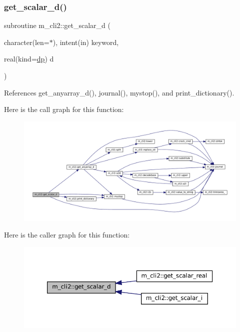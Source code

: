 \subsubsection{\texorpdfstring{get\+\_\+scalar\+\_\+d()}{get\_scalar\_d()}}
{\footnotesize\ttfamily subroutine m\+\_\+cli2\+::get\+\_\+scalar\+\_\+d (\begin{DoxyParamCaption}\item[{character(len=$\ast$), intent(in)}]{keyword,  }\item[{real(kind=\mbox{\hyperlink{namespacem__cli2_acf83f1963cf6a56ad0221cfcf5402440}{dp}})}]{d }\end{DoxyParamCaption})\hspace{0.3cm}{\ttfamily [private]}}



References get\+\_\+anyarray\+\_\+d(), journal(), mystop(), and print\+\_\+dictionary().

Here is the call graph for this function\+:
\nopagebreak
\begin{figure}[H]
\begin{center}
\leavevmode
\includegraphics[width=350pt]{namespacem__cli2_a338757660adde093db76b7d5559a1906_cgraph}
\end{center}
\end{figure}
Here is the caller graph for this function\+:\nopagebreak
\begin{figure}[H]
\begin{center}
\leavevmode
\includegraphics[width=350pt]{namespacem__cli2_a338757660adde093db76b7d5559a1906_icgraph}
\end{center}
\end{figure}
\mbox{\label{namespacem__cli2_a9dcc99d34db1771959a1461274ae073e}} 
